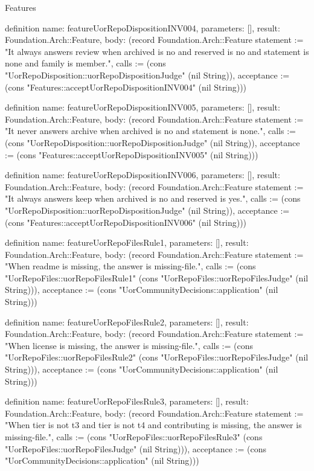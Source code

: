 \begin{lexlean}{Features}
\begin{semanticmodule}
definition{
  name: featureUorRepoDispositionINV004,
  parameters: [],
  result: Foundation.Arch::Feature,
  body: (record Foundation.Arch::Feature {statement := "It always answers review when archived is no and reserved is no and statement is none and family is member.", calls := (cons "UorRepoDisposition::uorRepoDispositionJudge" (nil String)), acceptance := (cons "Features::acceptUorRepoDispositionINV004" (nil String))})
}

definition{
  name: featureUorRepoDispositionINV005,
  parameters: [],
  result: Foundation.Arch::Feature,
  body: (record Foundation.Arch::Feature {statement := "It never answers archive when archived is no and statement is none.", calls := (cons "UorRepoDisposition::uorRepoDispositionJudge" (nil String)), acceptance := (cons "Features::acceptUorRepoDispositionINV005" (nil String))})
}

definition{
  name: featureUorRepoDispositionINV006,
  parameters: [],
  result: Foundation.Arch::Feature,
  body: (record Foundation.Arch::Feature {statement := "It always answers keep when archived is no and reserved is yes.", calls := (cons "UorRepoDisposition::uorRepoDispositionJudge" (nil String)), acceptance := (cons "Features::acceptUorRepoDispositionINV006" (nil String))})
}

definition{
  name: featureUorRepoFilesRule1,
  parameters: [],
  result: Foundation.Arch::Feature,
  body: (record Foundation.Arch::Feature {statement := "When readme is missing, the answer is missing-file.", calls := (cons "UorRepoFiles::uorRepoFilesRule1" (cons "UorRepoFiles::uorRepoFilesJudge" (nil String))), acceptance := (cons "UorCommunityDecisions::application" (nil String))})
}

definition{
  name: featureUorRepoFilesRule2,
  parameters: [],
  result: Foundation.Arch::Feature,
  body: (record Foundation.Arch::Feature {statement := "When license is missing, the answer is missing-file.", calls := (cons "UorRepoFiles::uorRepoFilesRule2" (cons "UorRepoFiles::uorRepoFilesJudge" (nil String))), acceptance := (cons "UorCommunityDecisions::application" (nil String))})
}

definition{
  name: featureUorRepoFilesRule3,
  parameters: [],
  result: Foundation.Arch::Feature,
  body: (record Foundation.Arch::Feature {statement := "When tier is not t3 and tier is not t4 and contributing is missing, the answer is missing-file.", calls := (cons "UorRepoFiles::uorRepoFilesRule3" (cons "UorRepoFiles::uorRepoFilesJudge" (nil String))), acceptance := (cons "UorCommunityDecisions::application" (nil String))})
}


\end{semanticmodule}
\end{lexlean}
